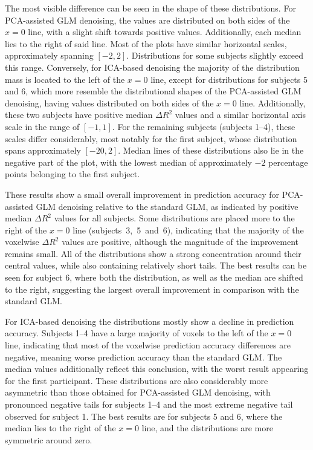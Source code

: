 \documentclass[english]{pwr_wmat_praca_dyplomowa}
\theoremstyle{definition}
\theoremstyle{remark}
\begin{document}
The most visible difference can be seen in the shape of these distributions. For PCA-assisted GLM denoising, the values are distributed on both sides of the $x=0$ line, with a slight shift towards positive values. Additionally, each median lies to the right of said line. Most of the plots have similar horizontal scales, approximately spanning $[-2, 2]$. Distributions for some subjects slightly exceed this range.
Conversely, for ICA-based denoising the majority of the distribution mass is located to the left of the $x=0$ line, except for distributions for subjects 5 and 6, which more resemble the distributional shapes of the PCA-assisted GLM denoising, having values distributed on both sides of the $x=0$ line. Additionally, these two subjects have positive median $\Delta R^2$ values and a similar horizontal axis scale in the range of $[-1, 1]$. For the remaining subjects (subjects 1--4), these scales differ considerably, most notably for the first subject, whose distribution spans approximately $[-20, 2]$. Median lines of these distributions also lie in the negative part of the plot, with the lowest median of approximately $-2$ percentage points belonging to the first subject.

These results show a small overall improvement in prediction accuracy for PCA-assisted GLM denoising relative to the standard GLM, as indicated by positive median $\Delta R^2$ values for all subjects. Some distributions are placed more to the right of the $x=0$ line (subjects~3,~5~and~6), indicating that the majority of the voxelwise $\Delta R^2$ values are positive, although the magnitude of the improvement remains small. All of the distributions show a strong concentration around their central values, while also containing relatively short tails. The best results can be seen for subject 6, where both the distribution, as well as the median are shifted to the right, suggesting the largest overall improvement in comparison with the standard GLM.

For ICA-based denoising the distributions mostly show a decline in prediction accuracy. Subjects 1--4 have a large majority of voxels to the left of the $x=0$ line, indicating that most of the voxelwise prediction accuracy differences are negative, meaning worse prediction accuracy than the standard GLM. The median values additionally reflect this conclusion, with the worst result appearing for the first participant. These distributions are also considerably more asymmetric than those obtained for PCA-assisted GLM denoising, with pronounced negative tails for subjects 1–4 and the most extreme negative tail observed for subject 1. The best results are for subjects 5 and 6, where the median lies to the right of the $x=0$ line, and the distributions are more symmetric around zero.
\end{document}
